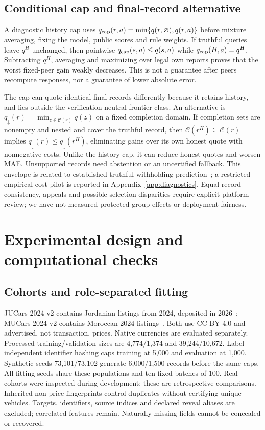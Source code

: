 \documentclass[11pt]{article}
\begin{document}
\subsection{Conditional cap and final-record alternative}
A diagnostic history cap uses
$q_{\rm cap}(r,a)=\min\{q(r,\varnothing),q(r,a)\}$ before mixture averaging,
fixing the model, public scores and rule weights. If truthful queries leave
$q^H$ unchanged, then pointwise $q_{\rm cap}(s,a)\le q(s,a)$ while
$q_{\rm cap}(H,a)=q^H$. Subtracting $q^H$, averaging and maximizing over
legal own reports proves that the worst fixed-peer gain weakly decreases.
This is not a guarantee after peers recompute responses, nor a guarantee of
lower absolute error.

The cap can quote identical final records differently because it retains
history, and lies outside the verification-neutral frontier class.
An alternative is $q_{\downarrow}(r)=\min_{z\in\mathcal C(r)}q(z)$ on a
fixed completion domain. If completion sets are nonempty and nested and
cover the truthful record, then
$\mathcal C(r^H)\subseteq\mathcal C(r)$ implies
$q_{\downarrow}(r)\le q_{\downarrow}(r^H)$, eliminating gains over its own
honest quote with nonnegative costs. Unlike the history cap, it can reduce
honest quotes and worsen MAE. Unsupported records need abstention or an
uncertified fallback. This envelope is related to established truthful
withholding prediction~\cite{withheld,smi}; a restricted empirical cost pilot
is reported in Appendix~\ref{app:diagnostics}. Equal-record consistency,
appeals and possible selection disparities require explicit platform review;
we have not measured protected-group effects or deployment fairness.

\section{Experimental design and computational checks}\label{sec:experiment_setup}
\subsection{Cohorts and role-separated fitting}
JUCars-2024 v2 contains Jordanian listings from 2024, deposited in
2026~\cite{jucarsdata}; MUCars-2024 v2 contains Moroccan 2024 listings~\cite{mucarsdata}.
Both use CC BY 4.0 and advertised, not transaction, prices. Native currencies
are evaluated separately. Processed training/validation sizes are
4,774/1,374 and 39,244/10,672. Label-independent identifier hashing caps
training at 5,000 and evaluation at 1,000. Synthetic seeds 73,101/73,102
generate 6,000/1,500 records before the same caps. All fitting seeds share
these populations and ten fixed batches of 100. Real cohorts were inspected
during development; these are retrospective comparisons. Inherited non-price
fingerprints control duplicates without certifying unique vehicles. Targets,
identifiers, source indices and declared reveal aliases are excluded; correlated
features remain. Naturally missing fields cannot be concealed or recovered.
\end{document}
